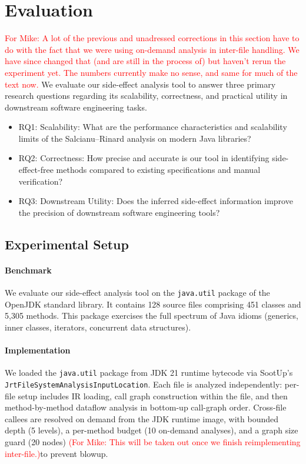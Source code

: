 \section{Evaluation}
\textcolor{red}{For Mike: A lot of the previous and unadressed corrections in this section have to do with the fact that we were using on-demand analysis in inter-file handling. We have since changed that (and are still in the process of) but haven't rerun the experiment yet. The numbers currently make no sense, and same for much of the text now. }
We evaluate our side-effect analysis tool to answer three primary research questions regarding its scalability, correctness, and practical utility in downstream software engineering tasks.


\begin{itemize}
    \item RQ1: Scalability: What are the performance characteristics and scalability limits of the Salcianu--Rinard analysis on modern Java libraries?

    \item RQ2: Correctness: How precise and accurate is our tool in identifying side-effect-free methods compared to existing specifications and manual verification?

    \item RQ3: Downstream Utility: Does the inferred side-effect information improve the precision of downstream software engineering tools?
\end{itemize}

\subsection{Experimental Setup}

\paragraph{Benchmark}
We evaluate our side-effect analysis tool on the \texttt{java.util} package of the OpenJDK standard library. It contains 128 source files comprising 451 classes and 5,305 methods.
This package exercises the full spectrum of Java idioms (generics, inner classes, iterators, concurrent data structures). 

\paragraph{Implementation}
We loaded the \texttt{java.util} package from JDK 21 runtime bytecode via SootUp's \newline \texttt{JrtFileSystemAnalysisInputLocation}.
Each file is analyzed independently: per-file setup includes IR loading, call graph construction within the file, and then method-by-method dataflow analysis in bottom-up call-graph order.
Cross-file callees are resolved on demand from the JDK runtime image, with bounded depth (5 levels), a per-method budget (10 on-demand analyses), and a graph size guard (20 nodes) \textcolor{red}{(For Mike: This will be taken out once we finish reimplementing inter-file.)}to prevent blowup.




